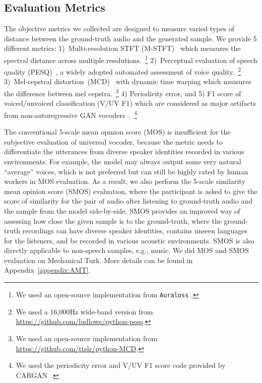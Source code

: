 \documentclass{article} \usepackage{iclr2023_conference,times}
\theoremstyle{plain}
\theoremstyle{definition}
\theoremstyle{remark}
\begin{document}
\subsection{Evaluation Metrics}
\vspace{-.1cm}
The objective metrics we collected are designed to measure varied types of distance between the ground-truth audio and the generated sample. We provide 5 different metrics: 
1)~Multi-resolution STFT (M-STFT)~\citep{yamamoto2020parallel} which measures the spectral distance across multiple resolutions.~\footnote{We used an open-source implementation from \texttt{Auraloss} \citep{steinmetz2020auraloss}.}
2)~Perceptual evaluation of speech quality (PESQ)~\citep{rix2001perceptual}, a widely adopted automated assessment of voice quality.~\footnote{We used a 16,000Hz wide-band version from \url{https://github.com/ludlows/python-pesq}.}
3)~Mel-cepstral distortion~(MCD)~\citep{kubichek1993mel} with dynamic time warping  which measures the difference between mel cepstra.~\footnote{We used an open-source implementation from \url{https://github.com/ttslr/python-MCD}.}
4) Periodicity error, and 
5) F1 score of voiced/unvoiced classification (V/UV F1) which are considered as major artifacts from non-autoregressive GAN vocoders~\citep{morrison2021chunked}.~\footnote{We used the periodicity error and V/UV F1 score code provided by CARGAN~\citep{morrison2021chunked}.}

The conventional 5-scale mean opinion score (MOS) is insufficient for the subjective evaluation of universal vocoder, because the metric needs to differentiate the utterances from diverse speaker identities recorded in various environments. For example, the model may always output some very natural ``average'' voices, which is not preferred but can still be highly rated by human workers in MOS evaluation.
As a result, we also perform the 5-scale similarity mean opinion score (SMOS) evaluation, where the participant is asked to give the score of similarity for the pair of audio after listening to ground-truth audio and the sample from the model side-by-side. SMOS provides an improved way of assessing how close the given sample is to the ground-truth, where the ground-truth recordings can have diverse speaker identities, contains unseen languages for the listeners, and be recorded in various acoustic environments. SMOS is also directly applicable to non-speech samples, e.g., music. 
We did MOS and SMOS evaluation on Mechanical Turk. More details can be found in Appendix~\ref{appendix:AMT}.
\end{document}
